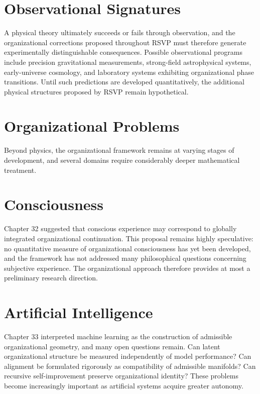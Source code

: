 \documentclass[11pt,oneside]{book}
\numberwithin{equation}{chapter}
\theoremstyle{definition}
\theoremstyle{plain}
\begin{document}
\section{Observational Signatures}

A physical theory ultimately succeeds or fails through observation, and the organizational corrections proposed throughout RSVP must therefore generate experimentally distinguishable consequences. Possible observational programs include precision gravitational measurements, strong-field astrophysical systems, early-universe cosmology, and laboratory systems exhibiting organizational phase transitions. Until such predictions are developed quantitatively, the additional physical structures proposed by RSVP remain hypothetical.

\section{Organizational Problems}

Beyond physics, the organizational framework remains at varying stages of development, and several domains require considerably deeper mathematical treatment.

\section{Consciousness}

Chapter 32 suggested that conscious experience may correspond to globally integrated organizational continuation. This proposal remains highly speculative: no quantitative measure of organizational consciousness has yet been developed, and the framework has not addressed many philosophical questions concerning subjective experience. The organizational approach therefore provides at most a preliminary research direction.

\section{Artificial Intelligence}

Chapter 33 interpreted machine learning as the construction of admissible organizational geometry, and many open questions remain. Can latent organizational structure be measured independently of model performance? Can alignment be formulated rigorously as compatibility of admissible manifolds? Can recursive self-improvement preserve organizational identity? These problems become increasingly important as artificial systems acquire greater autonomy.
\end{document}
